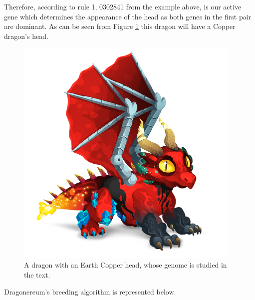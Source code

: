 \documentclass[12pt]{article}
\begin{document}
Therefore, according to rule 1, 0302841 from the example above, is our active gene which determines the appearance of the head as both genes in the first pair are dominant. As can be seen from Figure \ref{fig:A_dragon_with_an_Earth_Copper_head_whose_genome_is_studied_in_the_text} this dragon will have a Copper dragon's head.\par

\begin{Center}

\begin{figure}[H]
	\begin{Center}
		\includegraphics[width=4.26in,height=4.38in]{./media/BGimage28.png}
		\caption{A dragon with an Earth Copper head, whose genome is studied in the text.}
		\label{fig:A_dragon_with_an_Earth_Copper_head_whose_genome_is_studied_in_the_text}
	\end{Center}
\end{figure}


\end{Center}\par

Dragonereum’s breeding algorithm is represented below.\par
\end{document}
